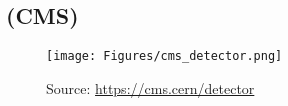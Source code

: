 \begin{appendices}
\chapter{\label{appendix}(CMS)}
\begin{figure}
    \centering
    \texttt{[image: Figures/cms\_detector.png]}
    \caption{Source: \url{https://cms.cern/detector}}
    \label{fig:my_label_detect}
\end{figure}
\end{appendices}


\setcounter{equation}{0}
\setcounter{table}{0}
\setcounter{figure}{0}
